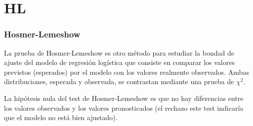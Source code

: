 \documentclass[10pt]{beamer}
\begin{document}


\section{HL}
\begin{frame}
\frametitle{Hosmer-Lemeshow}


La prueba de Hosmer-Lemeshow es otro método para estudiar la bondad de ajuste del modelo de regresión logística que consiste en comparar los valores previstos (esperados) por el modelo con los valores realmente
observados. Ambas distribuciones, esperada y observada, se contrastan mediante una prueba de $\chi^2$.

La hipótesis nula del test de Hosmer-Lemeshow es que no hay diferencias entre los valores observados y los valores pronosticados (el rechazo este test indicaría que el modelo no está bien ajustado).




\end{frame}

























\end{document}
